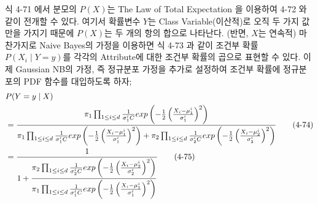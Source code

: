 \documentclass[a4paper]{oblivoir}
\begin{document}
\indent 식 4-71 에서 분모의 $P(X)$는 The Law of Total Expectation 을 이용하여 4-72 와 같이 전개할 수 있다. 여기서 확률변수 $Y$는 Class Variable(이산적)로 오직 두 가지 값만을 가지기 때문에 $P(X)$는 두 개의 항의 합으로 나타난다. (반면, $X$는 연속적) 마찬가지로 Naive Bayes의 가정을 이용하면 식 4-73 과 같이 조건부 확률 $P(X_{i} \mid Y=y)$를 각각의 Attribute에 대한 조건부 확률의 곱으로 표현할 수 있다. 이제 Gaussian NB의 가정, 즉 정규분포 가정을 추가로 설정하여 조건부 확률에 정규분포의 PDF 함수를 대입하도록 하자;
\begin{align}
&P(Y=y\mid X) \notag \\
&=\dfrac{\pi_{1}\prod_{1 \leq i \leq d}\frac{1}{\sigma_{1}^{i}C}exp\left(-\frac{1}{2}\left(\frac{X_{i}-\mu_{1}^{i}}{\sigma_{1}^{i}} \right)^{2} \right)}{\pi_{1}\prod_{1 \leq i \leq d}\frac{1}{\sigma_{1}^{i}C}exp\left(-\frac{1}{2}\left(\frac{X_{i}-\mu_{1}^{i}}{\sigma_{1}^{i}} \right)^{2} \right) + \pi_{2}\prod_{1 \leq i \leq d}\frac{1}{\sigma_{2}^{i}C}exp\left(-\frac{1}{2}\left(\frac{X_{i}-\mu_{2}^{i}}{\sigma_{2}^{i}} \right)^{2} \right)} \tag{4-74}\\
&=\dfrac{1}{1+\dfrac{\pi_{2}\prod_{1 \leq i \leq d}\frac{1}{\sigma_{2}^{i}C}exp\left(-\frac{1}{2}\left(\frac{X_{i}-\mu_{2}^{i}}{\sigma_{2}^{i}} \right)^{2} \right)}{\pi_{1}\prod_{1 \leq i \leq d}\frac{1}{\sigma_{1}^{i}C}exp\left(-\frac{1}{2}\left(\frac{X_{i}-\mu_{1}^{i}}{\sigma_{1}^{i}} \right)^{2} \right)}}\tag{4-75}
\end{align}
\end{document}

